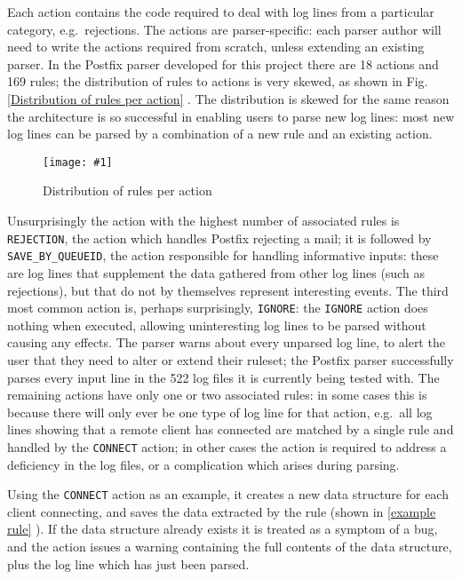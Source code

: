 \documentclass[draft]{svmult}
\newcommand{\showgraph}[3]{%
    \begin{figure}[hbt!]%
        \caption{#2}\label{#3}%
        \texttt{[image: \#1]}%
    \end{figure}%
}
\newcommand{\refwithpage}[1]{%
    \empty{}\vref{#1}%
}
\newcommand{\sectionref}[1]{%
    \textsection{}\vref*{#1}%
}
\newcommand{\numberOFrules}[0]{%
    169%
}
\newcommand{\numberOFlogFILESall}[0]{%
    522%
}
\newcommand{\numberOFactions}[0]{%
    18%
}
\begin{document}
Each action contains the code required to deal with log lines from a
particular category, e.g.\ rejections.  The actions are parser-specific:
each parser author will need to write the actions required from scratch,
unless extending an existing parser.  In the Postfix parser developed for
this project there are \numberOFactions{} actions and \numberOFrules{}
rules; the distribution of rules to actions is very skewed, as shown in
Fig.~\refwithpage{Distribution of rules per action}.  The distribution is
skewed for the same reason the architecture is so successful in enabling
users to parse new log lines: most new log lines can be parsed by a
combination of a new rule and an existing action.
\showgraph{build/plot-action-distribution}{Distribution of rules per
action}{Distribution of rules per action} Unsurprisingly the action with
the highest number of associated rules is \texttt{REJECTION}, the action
which handles Postfix rejecting a mail; it is followed by
\texttt{SAVE\_BY\_QUEUEID}, the action responsible for handling informative
inputs: these are log lines that supplement the data gathered from other
log lines (such as rejections), but that do not by themselves represent
interesting events.  The third most common action is, perhaps surprisingly,
\texttt{IGNORE}: the \texttt{IGNORE} action does nothing when executed,
allowing uninteresting log lines to be parsed without causing any effects.
The parser warns about every unparsed log line, to alert the user that they
need to alter or extend their ruleset; the Postfix parser successfully
parses every input line in the \numberOFlogFILESall{} log files it is
currently being tested with.  The remaining actions have only one or two
associated rules: in some cases this is because there will only ever be one
type of log line for that action, e.g.\ all log lines showing that a remote
client has connected are matched by a single rule and handled by the
\texttt{CONNECT} action; in other cases the action is required to address a
deficiency in the log files, or a complication which arises during parsing.

\label{example action}

Using the \texttt{CONNECT} action as an example, it creates a new data
structure for each client connecting, and saves the data extracted by the
rule (shown in \sectionref{example rule}).  If the data structure already
exists it is treated as a symptom of a bug, and the action issues a warning
containing the full contents of the data structure, plus the log line which
has just been parsed.
\end{document}
